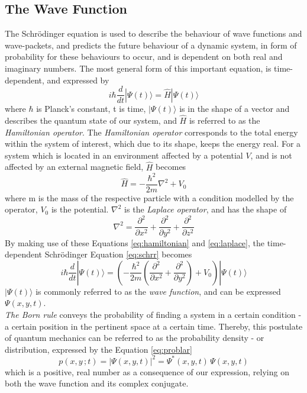 \documentclass[10pt, nofootinbib, twocolumn]{revtex4-1}
\begin{document}
\subsection{The Wave Function}
The Schrödinger equation is used to describe the behaviour of wave functions and wave-packets, and predicts the future behaviour of a dynamic system, in form of probability for these behaviours to occur, and is dependent on both real and imaginary numbers. The most general form of this important equation, is time-dependent, and expressed by 
\begin{equation}\label{eq:schrr}
    i \hbar \frac{d}{dt} |\Psi(t)\rangle = \hat{H} |\Psi(t)\rangle
\end{equation}
where $\hbar$ is Planck's constant, t is time, $|\Psi(t)\rangle$ is in the shape of a vector and describes the quantum state of our system, and $\hat{H}$ is referred to as the \textit{Hamiltonian operator}. The  \textit{Hamiltonian operator} corresponds to the total energy within the system of interest, which due to its shape, keeps the energy real. For a system which is located in an environment affected by a potential $V$, and is not affected by an external magnetic field, $\hat{H}$ becomes \cite{griffiths}
\begin{equation}\label{eq:hamiltonian}
    \hat{H}=-\frac{\hbar^2}{2m}\nabla^2 +V_0
\end{equation}
where m is the mass of the respective particle with a condition modelled by the operator, $V_0$ is the  potential. $\nabla^2$ is the \textit{Laplace operator}, and has the shape of 
\begin{equation}\label{eq:laplace}
    \nabla^2= \frac{\partial^2}{\partial x^2}+ \frac{\partial^2}{\partial y^2}+ \frac{\partial^2}{\partial z^2}
\end{equation}
By making use of these Equations \eqref{eq:hamiltonian} and \eqref{eq:laplace}, the time-dependent Schrödinger Equation \eqref{eq:schrr} becomes
\begin{equation}\label{eq:schrlar}
    i \hbar \frac{d}{dt} |\Psi(t)\rangle = (-\frac{\hbar^2}{2m}(\frac{\partial^2}{\partial x^2}+ \frac{\partial^2}{\partial y^2}) +V_0) |\Psi(t)\rangle
\end{equation}
$|\Psi(t)\rangle$ is commonly referred to as the \textit{wave function}, and can be expressed $\Psi(x,y,t)$. \\

\textit{The Born rule} conveys the probability of finding a system in a certain condition - a certain position in the pertinent space at a certain time. Thereby, this postulate of quantum mechanics can be referred to as the probability density \cite{thermal} - or distribution, expressed by the Equation \eqref{eq:problar}
\begin{equation}\label{eq:problar}
    p(x,y\,;t) = |\Psi(x,y,t)|^2 = \Psi^*(x,y,t) \, \Psi(x,y,t)
\end{equation}
which is a positive, real number as a consequence of our expression, relying on both the wave function and its complex conjugate. \\
\end{document}
